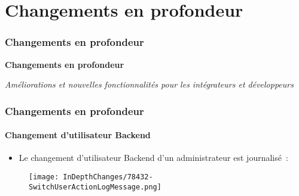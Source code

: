 %

\section{Changements en profondeur}
\begin{frame}[fragile]
	\frametitle{Changements en profondeur}

	\begin{center}\huge{\color{typo3darkgrey}\textbf{Changements en profondeur}}\end{center}
	\begin{center}\large{\textit{Améliorations et nouvelles fonctionnalités pour les intégrateurs et développeurs}}\end{center}

\end{frame}


\begin{frame}[fragile]
	\frametitle{Changements en profondeur}
	\framesubtitle{Changement d'utilisateur Backend}

	\begin{itemize}
		\item Le changement d'utilisateur Backend d'un administrateur est journalisé~:
	\end{itemize}

	\begin{figure}
		\texttt{[image: InDepthChanges/78432-SwitchUserActionLogMessage.png]}
	\end{figure}

\end{frame}



